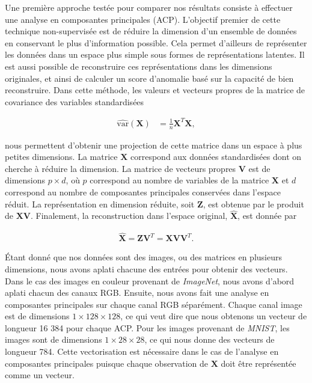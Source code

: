 Une première approche testée pour comparer nos résultats consiste à effectuer une analyse en composantes principales (ACP). L'objectif premier de cette technique non-supervisée est de réduire la dimension d'un ensemble de données en conservant le plus d'information possible. Cela permet d'ailleurs de représenter les données dans un espace plus simple sous formes de représentations latentes. Il est aussi possible de reconstruire ces représentations dans les dimensions originales, et ainsi de calculer un score d'anomalie basé sur la capacité de bien reconstruire. Dans cette méthode, les valeurs et vecteurs propres de la matrice de covariance des variables standardisées 

\begin{equation} \label{eq1}
	\begin{split}
		\hat{\text{var}}(\mathbf{X}) & = \frac{1}{n}\mathbf{X}^{T}\mathbf{X},
	\end{split}
\end{equation}


nous permettent d'obtenir une projection de cette matrice dans un espace à plus petites dimensions. La matrice $\mathbf{X}$ correspond aux données standardisées dont on cherche à réduire la dimension. La matrice de vecteurs propres $\mathbf{V}$ est de dimensions $p \times d$, où $p$ correspond au nombre de variables de la matrice $\mathbf{X}$ et $d$ correspond au nombre de composantes principales conservées dans l'espace réduit. La représentation en dimension réduite, soit $\mathbf{Z}$, est obtenue par le produit de $\mathbf{X}\mathbf{\mathbf{V}}$. Finalement, la reconstruction dans l'espace original, $\hat{\mathbf{X}}$, est donnée par

\begin{gather*}
	\hat{\mathbf{X}} = \mathbf{Z}\mathbf{V}^{T}=\mathbf{X}\mathbf{V}\mathbf{V}^{T}.
\end{gather*}

Étant donné que nos données sont des images, ou des matrices en plusieurs dimensions, nous avons aplati chacune des entrées pour obtenir des vecteurs. Dans le cas des images en couleur provenant de \textit{ImageNet}, nous avons d'abord aplati chacun des canaux RGB. Ensuite, nous avons fait une analyse en composantes principales sur chaque canal RGB séparément. Chaque canal image est de dimensions $1 \times 128 \times 128$, ce qui veut dire que nous obtenons un vecteur de longueur 16 384 pour chaque ACP. Pour les images provenant de \textit{MNIST}, les images sont de dimensions $1 \times 28 \times 28$, ce qui nous donne des vecteurs de longueur 784. Cette vectorisation est nécessaire dans le cas de l'analyse en composantes principales puisque chaque observation de $\mathbf{X}$ doit être représentée comme un vecteur.

